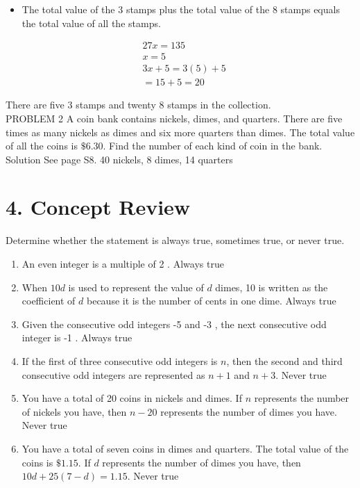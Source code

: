\documentclass{ximera}
\begin{document}
\begin{itemize}
  \item The total value of the 3\textcent{} stamps plus the total value of the 8 stamps equals the total value of all the stamps.
\end{itemize}

$$\begin{aligned}
& 27 x=135 \\
& x=5 \\
& 3 x+5=3(5)+5 \\
&=15+5=20
\end{aligned}$$

There are five 3\textcent{} stamps and twenty 8\textcent{} stamps in the collection.\\
PROBLEM 2 A coin bank contains nickels, dimes, and quarters. There are five times as many nickels as dimes and six more quarters than dimes. The total value of all the coins is $\$ 6.30$. Find the number of each kind of coin in the bank.\\
Solution See page S8. 40 nickels, 8 dimes, 14 quarters

\section*{4. Concept Review}
Determine whether the statement is always true, sometimes true, or never true.

\begin{enumerate}
  \item An even integer is a multiple of 2 . Always true
  \item When $10 d$ is used to represent the value of $d$ dimes, 10 is written as the coefficient of $d$ because it is the number of cents in one dime. Always true
  \item Given the consecutive odd integers -5 and -3 , the next consecutive odd integer is -1 . Always true
  \item If the first of three consecutive odd integers is $n$, then the second and third consecutive odd integers are represented as $n+1$ and $n+3$. Never true
  \item You have a total of 20 coins in nickels and dimes. If $n$ represents the number of nickels you have, then $n-20$ represents the number of dimes you have. Never true
  \item You have a total of seven coins in dimes and quarters. The total value of the coins is $\$ 1.15$. If $d$ represents the number of dimes you have, then $10 d+25(7-d)=1.15$. Never true
\end{enumerate}
\end{document}
